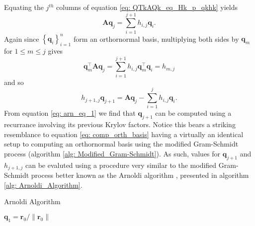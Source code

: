 Equating the $j^{th}$ columns of equation \ref{eq: QTkAQk_eq_Hk_p_qkhk} yields
\[
    \bm{A} \bm{q}_j = \sum_{i=1}^{j+1} h_{i,j} \bm{q}_{i}.
\]
Again since $\left\{ \bm{q}_i \right\}_{i=1}^{n}$ form an orthornormal basis, multiplying both sides by $\bm{q}_m$ for $1 \leq m \leq j$ gives
\[
    \bm{q}_m^{\intercal} \bm{A} \bm{q}_j = \sum_{i=1}^{j+1} h_{i,j} \bm{q}_m^{\intercal} \bm{q}_{i} = h_{m,j}
\]
and so
\begin{equation}\label{eq: arn_eq_1}
    h_{j+1,j} \bm{q}_{j+1} = \bm{A} \bm{q}_j - \sum_{i=1}^{j} h_{i,j} \bm{q}_{i}.
\end{equation}
From equation \ref{eq: arn_eq_1} we find that $\bm{q}_{j+1}$ can be computed using a recurrance involving its previous Krylov factors. Notice this bears a striking resemblance to equation \ref{eq: comp_orth_basis} having a virtually an identical setup to computing an orthornormal basis using the modified Gram-Schmidt process (algorithm \ref{alg: Modified_Gram-Schmidt}). As such, values for $\bm{q}_{j+1}$ and $h_{j+1,j}$ can be evaluted using a procedure very similar to the modified Gram-Schmidt process better known as the Arnoldi algorithm \cite{TrefethenLloydN.LloydNicholas1997Nla/,DemmelJamesW1997Anla}, presented in algorithm \ref{alg: Arnoldi_Algorithm}.

{\centering
\begin{minipage}{.85\linewidth}
    \begin{algorithm}[H]
        \caption{Arnoldi Algorithm}
        \label{alg: Arnoldi_Algorithm}
        \SetAlgoLined
        \DontPrintSemicolon

        \BlankLine
        $\bm{q}_1 = \bm{r}_0 / \| \bm{r}_0 \|$\;
        \BlankLine
    \end{algorithm}
\end{minipage}
\par
}

